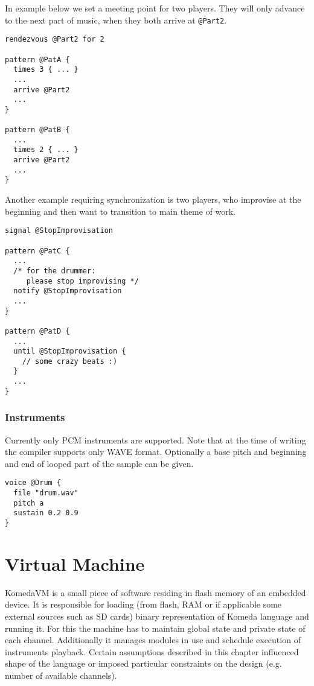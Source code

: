 \documentclass{article}
\begin{document}
In example below we set a meeting point for two players. They will only advance
to the next part of music, when they both arrive at {\tt @Part2}.

\begin{lstlisting}[caption=Use of meeting points for synchronization]
rendezvous @Part2 for 2

pattern @PatA {
  times 3 { ... }
  ...
  arrive @Part2
  ...
}

pattern @PatB {
  ...
  times 2 { ... }
  arrive @Part2
  ...
}
\end{lstlisting}

Another example requiring synchronization is two players, who improvise at the
beginning and then want to transition to main theme of work.

\begin{lstlisting}[caption=Communication through signalling]
signal @StopImprovisation

pattern @PatC {
  ...
  /* for the drummer:
     please stop improvising */
  notify @StopImprovisation
  ...
}

pattern @PatD {
  ...
  until @StopImprovisation {
    // some crazy beats :)
  }
  ...
}
\end{lstlisting}

\subsubsection{Instruments}

Currently only PCM instruments are supported. Note that at the time of writing
the compiler supports only WAVE format. Optionally a base pitch and beginning
and end of looped part of the sample can be given.

\begin{lstlisting}[caption=Example voice definition]
voice @Drum {
  file "drum.wav"
  pitch a
  sustain 0.2 0.9
}
\end{lstlisting}

\section{Virtual Machine}

KomedaVM is a small piece of software residing in flash memory of an embedded
device. It is responsible for loading (from flash, RAM or if applicable some
external sources such as SD cards) binary representation of Komeda language and
running it. For this the machine has to maintain global state and private state
of each channel. Additionally it manages modules in use and schedule execution
of instruments playback. Certain assumptions described in this chapter
influenced shape of the language or imposed particular constraints on the
design (e.g. number of available channels).  
\end{document}
